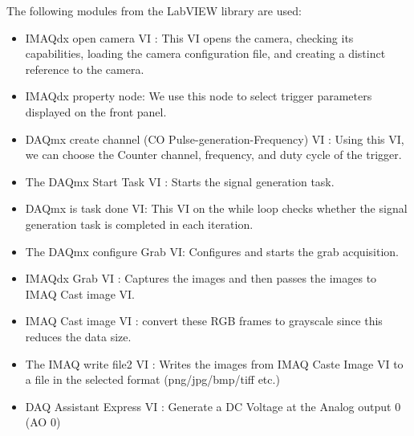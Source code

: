 \documentclass[journal=jacsat,manuscript=article]{achemso}
\begin{document}
The following modules from the LabVIEW library are used:
\begin{itemize}
	\item IMAQdx open camera VI : This VI opens the camera, checking its capabilities, loading the camera configuration file, and creating a distinct reference to the camera. 
	\item IMAQdx property node: We use this node to select trigger parameters displayed on the front panel.
	\item DAQmx create channel (CO Pulse-generation-Frequency) VI : Using this VI, we can choose the Counter channel, frequency, and duty cycle of the trigger.
	\item The DAQmx Start Task VI : Starts the signal generation task.
	\item DAQmx is task done VI: This VI  on the while loop checks whether the signal generation task is completed in each iteration.
	\item The DAQmx configure Grab VI: Configures and starts the grab acquisition.
	\item IMAQdx Grab VI : Captures the images and then passes the images to IMAQ Cast image VI.
	\item IMAQ Cast image VI : convert these RGB frames to grayscale since this reduces the data size.
	\item The IMAQ write file2 VI : Writes the images from IMAQ Caste Image VI to a file in the selected format (png/jpg/bmp/tiff etc.) 
	\item DAQ Assistant Express VI : Generate a DC Voltage at the Analog output 0 (AO 0)
\end{itemize}


\end{document}
